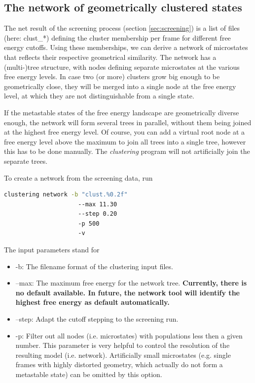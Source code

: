 \documentclass[12pt,a4paper,twoside,english,fleqn]{article}
\begin{document}
\subsection{The network of geometrically clustered states
            \label{sec:network_generation}}
The net result of the screening process (section \ref{sec:screening}) is a list
of files (here: clust\_*) defining the cluster membership per frame for
different free energy cutoffs. Using these memberships, we can derive a network
of microstates that reflects their respective geometrical similarity.
The network has a (multi-)tree structure, with nodes defining separate
microstates at the various free energy levels. In case two (or more) clusters
grow big enough to be geometrically close, they will be merged into a single
node at the free energy level, at which they are not distinguishable from a
single state.

If the metastable states of the free energy landscape are geometrically diverse
enough, the network will form several trees in parallel, without them being
joined at the highest free energy level. Of course, you can add a virtual root
node at a free energy level above the maximum to join all trees into a single
tree, however this has to be done manually.
The \emph{clustering} program will not artificially join the separate trees.

To create a network from the screening data, run
\begin{lstlisting}[language=bash,basicstyle=\ttfamily]
  clustering network -b "clust.%0.2f"
                     --max 11.30
                     --step 0.20
                     -p 500
                     -v
\end{lstlisting}
The input parameters stand for
\begin{itemize}
  \item -b: The filename format of the clustering input files.
  \item --max: The maximum free energy for the network tree.
               \textbf{Currently, there is no default available. In future,
                       the network tool will identify the highest free energy
                       as default automatically.}
  \item --step: Adapt the cutoff stepping to the screening run.
  \item -p: Filter out all nodes (i.e. microstates) with populations less then
            a given number. This parameter is very helpful to control the
            resolution of the resulting model (i.e. network). Artificially
            small microstates (e.g. single frames with highly distorted
            geometry, which actually do not form a metastable state) can be
            omitted by this option.
\end{itemize}
\end{document}
